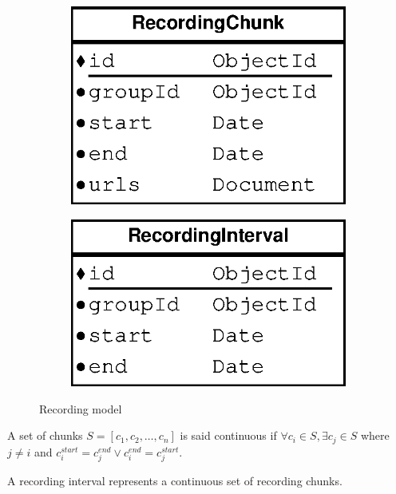 \begin{figure}[H]
    \centering
    \begin{subfigure}[b]{0.25\textwidth}
    	\includegraphics[width=\textwidth]{figures/model_recording_chunk}
    \end{subfigure}
    \begin{subfigure}[b]{0.25\textwidth}
    	\includegraphics[width=\textwidth]{figures/model_recording_interval}
    \end{subfigure}
    \caption{Recording model}
\end{figure} 

A set of chunks $S=[c_1,c_2,\ldots,c_n]$ is said continuous if $\forall c_i\in S, \exists c_j \in S$ where $j\neq i$ and $c_i^{start} = c_j^{end} \vee c_i^{end} = c_j^{start}$. 

A recording interval represents a continuous set of recording chunks.